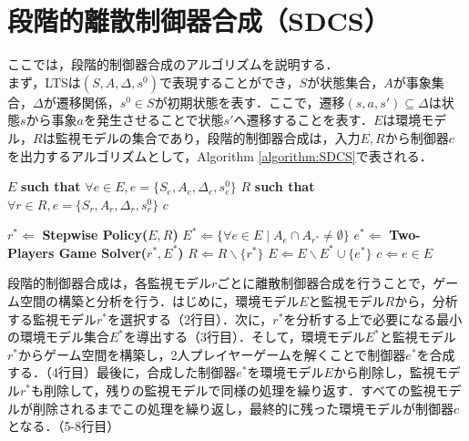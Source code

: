 \documentclass[technicalreport]{ieicej}
\begin{document}
\section{段階的離散制御器合成（SDCS）}
ここでは，段階的制御器合成\cite{yamauchi}のアルゴリズムを説明する．\\
\indent
まず，LTSは$(S, A, \Delta, s^0)$で表現することができ，$S$が状態集合，$A$が事象集合，$\Delta$が遷移関係，$s^0 \in S$が初期状態を表す．ここで，遷移$(s, a, s')\subseteq \Delta$は状態$s$から事象$a$を発生させることで状態$s'$へ遷移することを表す．$E$は環境モデル，$R$は監視モデルの集合であり，段階的制御器合成は，入力$E, R$から制御器$c$を出力するアルゴリズムとして，Algorithm \ref{algorithm:SDCS}で表される．
\begin{algorithm}[t]
\caption{段階的離散制御器合成}
\label{algorithm:SDCS}
\begin{algorithmic}[1]
\renewcommand{\algorithmicrequire}{\textbf{Input:}}
\renewcommand{\algorithmicensure}{\textbf{Output:}}
\REQUIRE $E$ {\bf such that} $\forall e \in E, e = \{S_{e}, A_{e}, \Delta_{e}, s^0_{e}\}$
\REQUIRE $R$ {\bf such that} $\forall r \in R, e = \{S_{r}, A_{r}, \Delta_{r}, s^0_{r}\}$
\ENSURE  $c$

  \STATE $r^* \Leftarrow $ {\bf Stepwise Policy($E,R$)}
  \STATE $E^* \Leftarrow \{\forall e \in E \mid A_e \cap A_{r^*} \neq \emptyset\}$
  \STATE $e^* \Leftarrow $ {\bf Two-Players Game Solver($r^*,E^*$)}
  \STATE $R \Leftarrow R \backslash \{r^*\}$
  \STATE $E \Leftarrow E \backslash E^* \cup \{e^*\}$
\ENDFOR
{} $c \Leftarrow e \in E$
\end{algorithmic}
\end{algorithm}
段階的制御器合成は，各監視モデル$r$ごとに離散制御器合成を行うことで，ゲーム空間の構築と分析を行う．はじめに，環境モデル$E$と監視モデル$R$から，分析する監視モデル$r^*$を選択する（2行目）．次に，$r^*$を分析する上で必要になる最小の環境モデル集合$E^*$を導出する（3行目）．そして，環境モデル$E^*$と監視モデル$r^*$からゲーム空間を構築し，2人プレイヤーゲームを解くことで制御器$e^*$を合成する．（4行目）最後に，合成した制御器$e^*$を環境モデル$E$から削除し，監視モデル$r^*$も削除して，残りの監視モデルで同様の処理を繰り返す．すべての監視モデルが削除されるまでこの処理を繰り返し，最終的に残った環境モデルが制御器$c$となる．（5-8行目）\\
\indent
\end{document}
